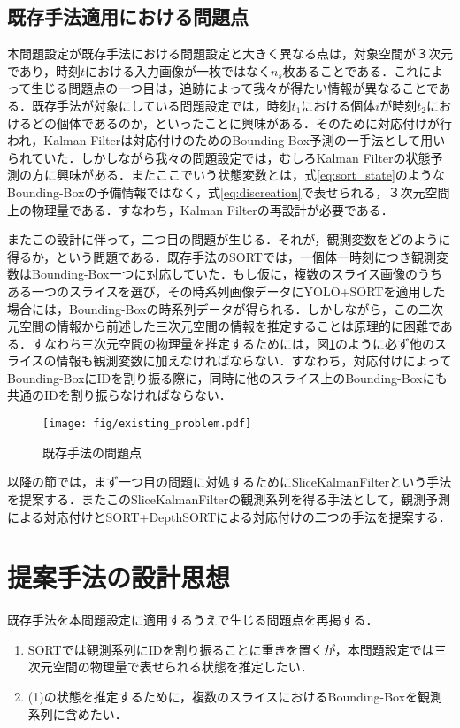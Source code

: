     \subsection{既存手法適用における問題点}
    本問題設定が既存手法における問題設定と大きく異なる点は，対象空間が３次元であり，時刻$t$における入力画像が一枚ではなく$n_s$枚あることである．これによって生じる問題点の一つ目は，追跡によって我々が得たい情報が異なることである．既存手法が対象にしている問題設定では，時刻$t_1$における個体$i$が時刻$t_2$におけるどの個体であるのか，といったことに興味がある．そのために対応付けが行われ，Kalman Filterは対応付けのためのBounding-Box予測の一手法として用いられていた．しかしながら我々の問題設定では，むしろKalman Filterの状態予測の方に興味がある．またここでいう状態変数とは，式\ref{eq:sort_state}のようなBounding-Boxの予備情報ではなく，式\ref{eq:discreation}で表せられる，３次元空間上の物理量である．すなわち，Kalman Filterの再設計が必要である．
    \par
    またこの設計に伴って，二つ目の問題が生じる．それが，観測変数をどのように得るか，という問題である．既存手法のSORTでは，一個体一時刻につき観測変数はBounding-Box一つに対応していた．もし仮に，複数のスライス画像のうちある一つのスライスを選び，その時系列画像データにYOLO+SORTを適用した場合には，Bounding-Boxの時系列データが得られる．しかしながら，この二次元空間の情報から前述した三次元空間の情報を推定することは原理的に困難である．すなわち三次元空間の物理量を推定するためには，図\ref{fig:existing_problem}のように必ず他のスライスの情報も観測変数に加えなければならない．すなわち，対応付けによってBounding-BoxにIDを割り振る際に，同時に他のスライス上のBounding-Boxにも共通のIDを割り振らなければならない．

    \begin{figure}[t]
        \centering
        \texttt{[image: fig/existing\_problem.pdf]}
        \caption[既存手法の問題点]{既存手法の問題点}
        \label{fig:existing_problem}
    \end{figure}

    以降の節では，まず一つ目の問題に対処するためにSliceKalmanFilterという手法を提案する．またこのSliceKalmanFilterの観測系列を得る手法として，観測予測による対応付けとSORT+DepthSORTによる対応付けの二つの手法を提案する．

\section{提案手法の設計思想}
既存手法を本問題設定に適用するうえで生じる問題点を再掲する．
\begin{enumerate}[label=(\arabic*)]
    \item SORTでは観測系列にIDを割り振ることに重きを置くが，本問題設定では三次元空間の物理量で表せられる状態を推定したい．
    \item (1)の状態を推定するために，複数のスライスにおけるBounding-Boxを観測系列に含めたい．
\end{enumerate}

